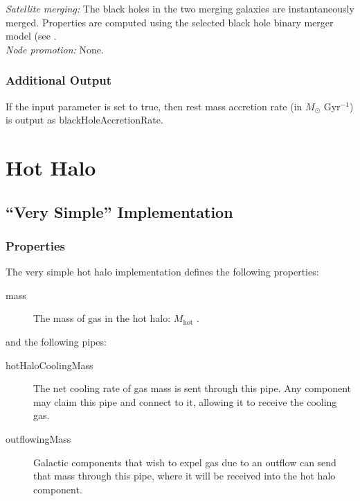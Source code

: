 \noindent\emph{Satellite merging:} The black holes in the two merging galaxies are instantaneously merged. Properties are computed using the selected black hole binary merger model (see .\\

\noindent\emph{Node promotion:} None.\\

\subsubsection{Additional Output}

If the {\normalfont \ttfamily [blackHoleOutputAccretion]} input parameter is set to true, then rest mass accretion rate (in $M_\odot$ Gyr$^{-1}$) is output as {\normalfont \ttfamily blackHoleAccretionRate}.

\section{Hot Halo}

\subsection{``Very Simple'' Implementation}

\subsubsection{Properties}

The very simple hot halo implementation defines the following properties:
\begin{description}
 \item [{\normalfont \ttfamily mass}] The mass of gas in the hot halo: $M_\mathrm{hot}$ {\normalfont \ttfamily [hotHaloMass]}.
\end{description}
and the following pipes:
\begin{description}
 \item [{\normalfont \ttfamily hotHaloCoolingMass}] The net cooling rate of gas mass is sent through this pipe. Any \gls{component} may claim this pipe and connect to it, allowing it to receive the cooling gas.
 \item [{\normalfont \ttfamily outflowingMass}] Galactic components that wish to expel gas due to an outflow can send that mass  through this pipe, where it will be received into the hot halo component. 
\end{description}

